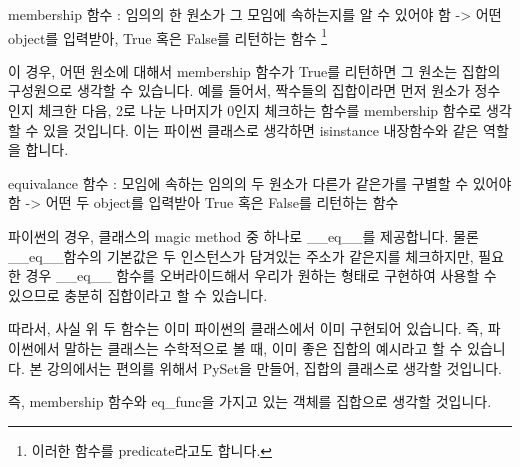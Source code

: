 \begin{compactitem} 
\item membership 함수 : 임의의 한 원소가 그 모임에 속하는지를 알 수 있어야 함 -> 어떤 object를 입력받아, True 혹은 False를 리턴하는 함수 \footnote{이러한 함수를 predicate라고도 합니다.} 

이 경우, 어떤 원소에 대해서 membership 함수가 True를 리턴하면 그 원소는 집합의 구성원으로 생각할 수 있습니다. 예를 들어서, 짝수들의 집합이라면 먼저 원소가 정수인지 체크한 다음, 2로 나눈 나머지가 0인지 체크하는 함수를 membership 함수로 생각할 수 있을 것입니다. 이는 파이썬 클래스로 생각하면 isinstance 내장함수와 같은 역할을 합니다. 

\item equivalance 함수 : 모임에 속하는 임의의 두 원소가 다른가 같은가를 구별할 수 있어야 함 -> 어떤 두 object를 입력받아 True 혹은 False를 리턴하는 함수

파이썬의 경우, 클래스의 magic method 중 하나로 \_\_eq\_\_를 제공합니다. 물론 \_\_eq\_\_함수의 기본값은 두 인스턴스가 담겨있는 주소가 같은지를 체크하지만, 필요한 경우 \_\_eq\_\_ 함수를 오버라이드해서 우리가 원하는 형태로 구현하여 사용할 수 있으므로 충분히 집합이라고 할 수 있습니다. 
\end{compactitem}

따라서, 사실 위 두 함수는 이미 파이썬의 클래스에서 이미 구현되어 있습니다. 즉, 파이썬에서 말하는 클래스는 수학적으로 볼 때, 이미 좋은 집합의 예시라고 할 수 있습니다. 본 강의에서는 편의를 위해서 PySet을 만들어, 집합의 클래스로 생각할 것입니다. 



즉, membership 함수와 eq\_func을 가지고 있는 객체를 집합으로 생각할 것입니다. 


%
%
%
%
%


